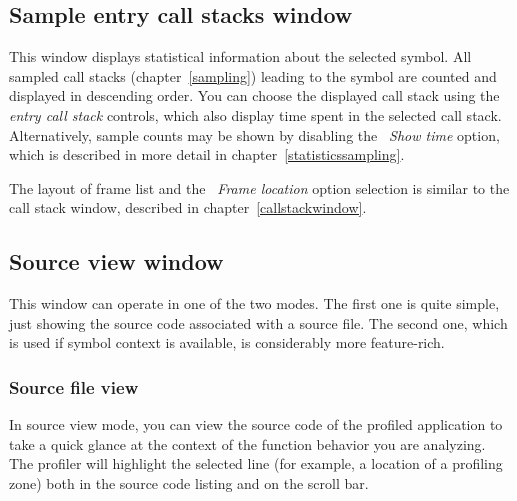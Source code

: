 \documentclass[hidelinks,titlepage,a4paper]{article}
\begin{document}
\subsection{Sample entry call stacks window}
\label{sampleparents}

This window displays statistical information about the selected symbol. All sampled call stacks (chapter~\ref{sampling}) leading to the symbol are counted and displayed in descending order. You can choose the displayed call stack using the \emph{entry call stack} controls, which also display time spent in the selected call stack. Alternatively, sample counts may be shown by disabling the \emph{\faStopwatch{}~Show time} option, which is described in more detail in chapter~\ref{statisticssampling}.

The layout of frame list and the \emph{\faAt{}~Frame location} option selection is similar to the call stack window, described in chapter~\ref{callstackwindow}.

\subsection{Source view window}
\label{sourceview}

This window can operate in one of the two modes. The first one is quite simple, just showing the source code associated with a source file. The second one, which is used if symbol context is available, is considerably more feature-rich.

\subsubsection{Source file view}

In source view mode, you can view the source code of the profiled application to take a quick glance at the context of the function behavior you are analyzing. The profiler will highlight the selected line (for example, a location of a profiling zone) both in the source code listing and on the scroll bar.
\end{document}
